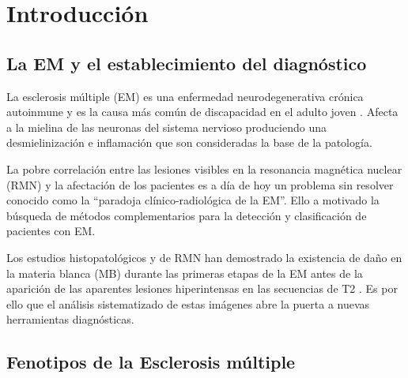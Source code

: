 \documentclass[fleqn,10pt]{UICArticle} %
\affiliation{\textsuperscript{1}\textit{Facultad de Medicina, Universitat Internacional de Catalunya, Barcelona, Spain}}
\affiliation{*\textbf{Datos de contacto}: gabriel.mp@uic.es} %
\begin{document}
\flushbottom 

\maketitle

\tableofcontents

\thispagestyle{empty} 
\clearpage


\section{Introducción}

\subsection{La EM y el establecimiento del diagnóstico}

La esclerosis múltiple (EM) es una enfermedad neurodegenerativa crónica autoinmune y es la causa más común de discapacidad en el adulto joven \cite{Polman2011}. Afecta a la mielina de las neuronas del sistema nervioso produciendo una desmielinización e inflamación que son consideradas la base de la patología.

La pobre correlación entre las lesiones visibles en la resonancia magnética nuclear (RMN) y la afectación de los pacientes es a día de hoy un problema sin resolver conocido como la “paradoja clínico-radiológica de la EM”. Ello a motivado la búsqueda de métodos complementarios para la detección y clasificación de pacientes con EM.

Los estudios histopatológicos y de RMN han demostrado la existencia de daño en la materia blanca (MB) durante las primeras etapas de la EM antes de la aparición de las aparentes lesiones hiperintensas en las secuencias de T2 \cite{Beer2016}. Es por ello que el análisis sistematizado de estas imágenes abre la puerta a nuevas herramientas diagnósticas.

\subsection{Fenotipos de la Esclerosis múltiple}
\end{document}

